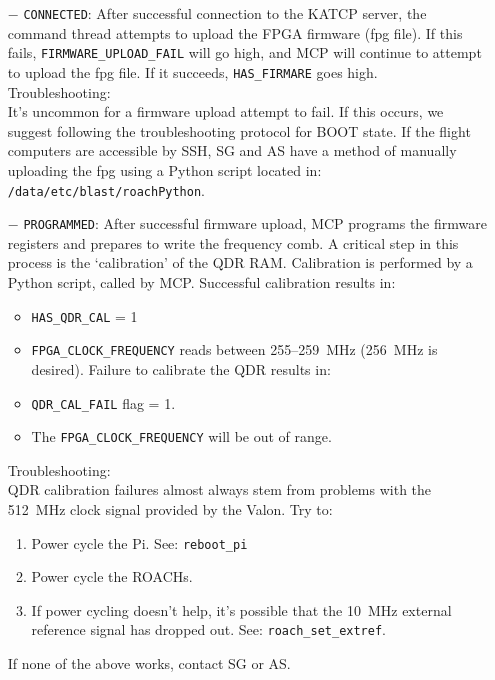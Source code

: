 \begin{itemize}[leftmargin=*,label={}]
\begin{itemize}
\item[$-$] \texttt{CONNECTED}: After successful connection to the KATCP server, the command thread attempts to upload the FPGA firmware (fpg file). If this fails, \texttt{FIRMWARE\_UPLOAD\_FAIL} will go high, and MCP will continue to attempt to upload the fpg file. If it succeeds, \texttt{HAS\_FIRMARE} goes high.\\
Troubleshooting:\\
It’s uncommon for a firmware upload attempt to fail. If this occurs, we suggest following the troubleshooting protocol for BOOT state. If the flight computers are accessible by SSH, SG and AS have a method of manually uploading the fpg using a Python script located in: \texttt{/data/etc/blast/roachPython}.

\item[$-$] \texttt{PROGRAMMED}: After successful firmware upload, MCP programs the firmware registers and prepares to write the frequency comb. A critical step in this process is the ‘calibration’ of the QDR RAM\@. Calibration is performed by a Python script, called by MCP\@. Successful calibration results in:
\begin{itemize}
  \item \texttt{HAS\_QDR\_CAL} = 1
  \item \texttt{FPGA\_CLOCK\_FREQUENCY} reads between 255--259~MHz (256~MHz is desired).
  Failure to calibrate the QDR results in:
  \item \texttt{QDR\_CAL\_FAIL} flag = 1.
  \item The \texttt{FPGA\_CLOCK\_FREQUENCY} will be out of range.
\end{itemize}
Troubleshooting:\\
QDR calibration failures almost always stem from problems with the 512~MHz clock signal provided by the Valon. Try to:
\begin{enumerate}
  \item Power cycle the Pi. See: \texttt{reboot\_pi}
  \item Power cycle the ROACHs.
  \item If power cycling doesn’t help, it’s possible that the 10~MHz external reference signal has dropped out. See: \texttt{roach\_set\_extref}.
\end{enumerate}
If none of the above works, contact SG or AS\@.


\end{itemize}
\end{itemize}
